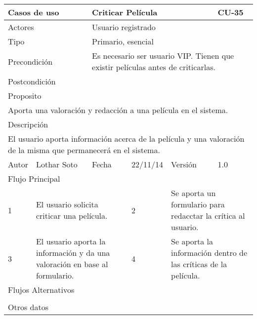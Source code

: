 \documentclass{article}
\begin{document}
\begin{table}[h]
\begin{tabular}{|l|l|l|l|l|l|}
\hline
\multicolumn{2}{|p{2cm}|}{Casos de uso}  & \multicolumn{3}{p{7cm}|}{Criticar Película} & CU-35 \\
\hline
\multicolumn{2}{|p{2cm}|}{Actores}       & \multicolumn{4}{p{8cm}|}{Usuario registrado}        \\
\hline
\multicolumn{2}{|p{2cm}|}{Tipo}          & \multicolumn{4}{p{8cm}|}{Primario, esencial}        \\
\hline
\multicolumn{2}{|p{2cm}|}{Precondición}  & \multicolumn{4}{p{8cm}|}{Es necesario ser usuario VIP. Tienen que existir películas antes de criticarlas.}        \\
\hline
\multicolumn{2}{|p{2cm}|}{Postcondición} & \multicolumn{4}{p{8cm}|}{}        \\
\hline
\multicolumn{6}{|p{10cm}|}{Proposito}                                   \\
\hline
\multicolumn{6}{|p{10cm}|}{Aporta una valoración y redacción a una película en el sistema.}                                            \\
\hline
\multicolumn{6}{|p{10cm}|}{Descripción}                                 \\
\hline
\multicolumn{6}{|p{10cm}|}{El usuario aporta información acerca de la película y una valoración de la misma que permanecerá en el sistema.}                                            \\
\hline
Autor         &       Lothar Soto        &  Fecha   &  22/11/14   &   Versión  & 1.0\\
\hline
\multicolumn{6}{|p{10cm}|}{Flujo Principal}\\
\hline
\multicolumn{1}{|p{1cm}|}{1} & \multicolumn{2}{p{3cm}}{El usuario solicita criticar una película.} & \multicolumn{1}{|p{1cm}|}{2} & \multicolumn{2}{p{3cm}|}{Se aporta un formulario para redacctar la crítica al usuario.}\\
\hline
\multicolumn{1}{|p{1cm}|}{3} & \multicolumn{2}{p{3cm}}{El usuario aporta la información y da una valoración en base al formulario.} & \multicolumn{1}{|p{1cm}|}{4} & \multicolumn{2}{p{3cm}|}{Se aporta la información dentro de las críticas de la película.}\\
\hline
\multicolumn{6}{|p{10cm}|}{Flujos Alternativos}\\
\hline
\multicolumn{1}{|p{1cm}}{} & \multicolumn{5}{|p{9cm}|}{}\\
\hline
\multicolumn{6}{|p{10cm}|}{Otros datos}\\

\end{tabular}
\end{table}
\end{document}
